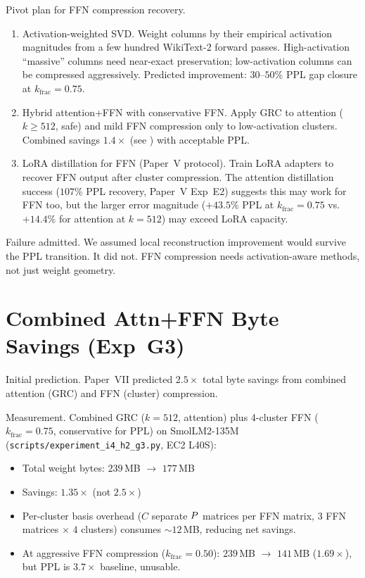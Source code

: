\documentclass[11pt]{article}
\begin{document}
Pivot plan for FFN compression recovery.
\begin{enumerate}
\item Activation-weighted SVD.  Weight columns by their empirical
      activation magnitudes from a few hundred WikiText-2 forward passes.
      High-activation ``massive'' columns need near-exact preservation;
      low-activation columns can be compressed aggressively.  Predicted
      improvement: $30$--$50\%$ PPL gap closure at $k_\text{frac}{=}0.75$.
\item Hybrid attention+FFN with conservative FFN.  Apply GRC
      to attention ($k{\ge}512$, safe) and mild FFN compression only to
      low-activation clusters.  Combined savings $1.4{\times}$ (see
      ) with acceptable PPL.
\item LoRA distillation for FFN (Paper~V protocol).  Train LoRA
      adapters to recover FFN output after cluster compression.  The
      attention distillation success ($107\%$ PPL recovery, Paper~V Exp~E2)
      suggests this may work for FFN too, but the larger error magnitude
      ($+43.5\%$ PPL at $k_\text{frac}{=}0.75$ vs.\ $+14.4\%$ for
      attention at $k{=}512$) may exceed LoRA capacity.
\end{enumerate}

Failure admitted.  We assumed local reconstruction improvement
would survive the PPL transition.  It did not.  FFN compression needs
activation-aware methods, not just weight geometry.

\section{Combined Attn+FFN Byte Savings (Exp~G3)}
\label{sec:g3-combined}

Initial prediction.  Paper~VII predicted $2.5{\times}$ total byte
savings from combined attention (GRC) and FFN (cluster) compression.

Measurement.  Combined GRC ($k{=}512$, attention) plus 4-cluster
FFN ($k_\text{frac}{=}0.75$, conservative for PPL) on SmolLM2-135M
(\texttt{scripts/experiment\_i4\_h2\_g3.py}, EC2 L40S):
\begin{itemize}
\item Total weight bytes: $239$\,MB $\to$ $177$\,MB
\item Savings: $1.35{\times}$ (not $2.5{\times}$)
\item Per-cluster basis overhead ($C$ separate $P$ matrices per FFN
      matrix, $3$ FFN matrices $\times$ $4$ clusters) consumes
      ${\sim}12$\,MB, reducing net savings.
\item At aggressive FFN compression ($k_\text{frac}{=}0.50$):
      $239$\,MB $\to$ $141$\,MB ($1.69{\times}$), but PPL is
      $3.7{\times}$ baseline, unusable.
\end{itemize}
\end{document}
